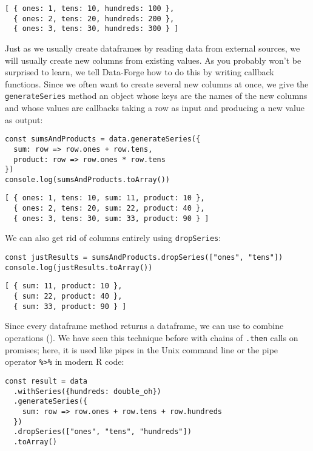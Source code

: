 \begin{verbatim}
[ { ones: 1, tens: 10, hundreds: 100 },
  { ones: 2, tens: 20, hundreds: 200 },
  { ones: 3, tens: 30, hundreds: 300 } ]
\end{verbatim}

Just as we usually create dataframes by reading data from external sources,
we will usually create new columns from existing values.
As you probably won't be surprised to learn,
we tell Data-Forge how to do this by writing callback functions.
Since we often want to create several new columns at once,
we give the \texttt{generateSeries} method an object
whose keys are the names of the new columns
and whose values are callbacks taking a row as input and producing a new value as output:

\begin{verbatim}
const sumsAndProducts = data.generateSeries({
  sum: row => row.ones + row.tens,
  product: row => row.ones * row.tens
})
console.log(sumsAndProducts.toArray())
\end{verbatim}

\begin{verbatim}
[ { ones: 1, tens: 10, sum: 11, product: 10 },
  { ones: 2, tens: 20, sum: 22, product: 40 },
  { ones: 3, tens: 30, sum: 33, product: 90 } ]
\end{verbatim}

We can also get rid of columns entirely using \texttt{dropSeries}:

\begin{verbatim}
const justResults = sumsAndProducts.dropSeries(["ones", "tens"])
console.log(justResults.toArray())
\end{verbatim}

\begin{verbatim}
[ { sum: 11, product: 10 },
  { sum: 22, product: 40 },
  { sum: 33, product: 90 } ]
\end{verbatim}

Since every dataframe method returns a dataframe,
we can use  to combine operations ().
We have seen this technique before with chains of \texttt{.then} calls on promises;
here,
it is used like pipes in the Unix command line
or the pipe operator \texttt{{\%}{\textgreater}{\%}} in modern R code:

\begin{verbatim}
const result = data
  .withSeries({hundreds: double_oh})
  .generateSeries({
    sum: row => row.ones + row.tens + row.hundreds
  })
  .dropSeries(["ones", "tens", "hundreds"])
  .toArray()
\end{verbatim}

